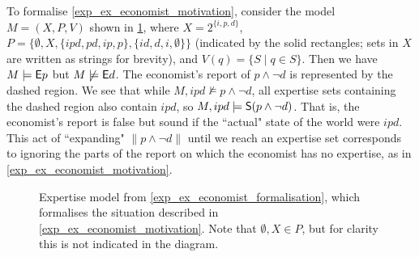\begin{example}
    \label{exp_ex_economist_formalisation}

    To formalise \cref{exp_ex_economist_motivation}, consider the model $M = (X, P,
    V)$ shown in \cref{exp_fig_economist_example}, where $X =
    2^{\{i,p,d\}}$, $P = \{\emptyset, X, \{ipd,pd,ip,p\},
    \{id,d,i,\emptyset\}\}$ (indicated by the solid rectangles; sets in $X$ are
    written as strings for brevity), and $V(q) =
    \{S \mid q \in S\}$. Then we have $M \models \E p$ but $M \not\models \E
    d$. The economist's report of $p \land \neg d$ is represented by the dashed
    region. We see that while $M, ipd \not\models p \land \neg d$, all
    expertise sets containing the dashed region also contain $ipd$, so $M, ipd
    \models \S(p \land \neg d)$. That is, the economist's report is false but
    sound if the ``actual" state of the world were $ipd$. This act of
    ``expanding" $\|p \land \neg d\|$ until we reach an expertise set
    corresponds to ignoring the parts of the report on which the economist has
    no expertise, as in \cref{exp_ex_economist_motivation}.

\end{example}

\begin{figure}
    \centering
    \caption{
        Expertise model from \cref{exp_ex_economist_formalisation}, which
        formalises the situation described in \cref{exp_ex_economist_motivation}.
        Note that $\emptyset, X \in P$, but for clarity this is not indicated
        in the diagram.
    }
    \label{exp_fig_economist_example}
\end{figure}

